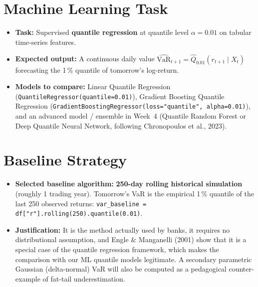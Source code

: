 \documentclass[10pt,a4paper]{article}
\newcommand{\code}[1]{\texttt{\small #1}}
\begin{document}
\section{Machine Learning Task}
\begin{itemize}
  \item \textbf{Task:} Supervised \textbf{quantile regression} at quantile level $\alpha = 0.01$ on tabular time-series features.
  \item \textbf{Expected output:} A continuous daily value $\widehat{\mathrm{VaR}}_{t+1} = \hat{Q}_{0.01}(r_{t+1} \mid X_t)$ forecasting the 1\,\% quantile of tomorrow's log-return.
  \item \textbf{Models to compare:} Linear Quantile Regression (\code{QuantileRegressor(quantile=0.01)}), Gradient Boosting Quantile Regression (\code{GradientBoostingRegressor(loss="quantile", alpha=0.01)}), and an advanced model / ensemble in Week~4 (Quantile Random Forest or Deep Quantile Neural Network, following Chronopoulos et al., 2023).
\end{itemize}

\section{Baseline Strategy}
\begin{itemize}
  \item \textbf{Selected baseline algorithm:} \textbf{250-day rolling historical simulation} (roughly 1 trading year). Tomorrow's VaR is the empirical 1\,\% quantile of the last 250 observed returns: \code{var\_baseline = df["r"].rolling(250).quantile(0.01)}.
  \item \textbf{Justification:} It is the method actually used by banks, it requires no distributional assumption, and Engle \& Manganelli (2001) show that it is a special case of the quantile regression framework, which makes the comparison with our ML quantile models legitimate. A secondary parametric Gaussian (delta-normal) VaR will also be computed as a pedagogical counter-example of fat-tail underestimation.
\end{itemize}

\end{document}
